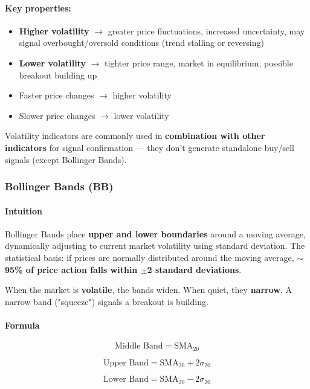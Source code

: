 \documentclass[12pt,openany]{book}
\begin{document}
\paragraph{Key properties:}
\begin{itemize}[leftmargin=*]
    \item \textbf{Higher volatility} \(\rightarrow\) greater price fluctuations, increased uncertainty, may signal overbought/oversold conditions (trend stalling or reversing)
    \item \textbf{Lower volatility} \(\rightarrow\) tighter price range, market in equilibrium, possible breakout building up
    \item Faster price changes \(\rightarrow\) higher volatility
    \item Slower price changes \(\rightarrow\) lower volatility
\end{itemize}

Volatility indicators are commonly used in \textbf{combination with other indicators} for signal confirmation --- they don't generate standalone buy/sell signals (except Bollinger Bands).

\subsubsection{Bollinger Bands (BB)}

\paragraph{Intuition}
Bollinger Bands place \textbf{upper and lower boundaries} around a moving average, dynamically adjusting to current market volatility using standard deviation. The statistical basis: if prices are normally distributed around the moving average, \textbf{\(\sim\)95\% of price action falls within \(\pm\)2 standard deviations}.

When the market is \textbf{volatile}, the bands widen. When quiet, they \textbf{narrow}. A narrow band ("squeeze") signals a breakout is building.

\paragraph{Formula}

\[
\text{Middle Band} = \text{SMA}_{20}
\]

\[
\text{Upper Band} = \text{SMA}_{20} + 2\sigma_{20}
\]

\[
\text{Lower Band} = \text{SMA}_{20} - 2\sigma_{20}
\]
\end{document}
